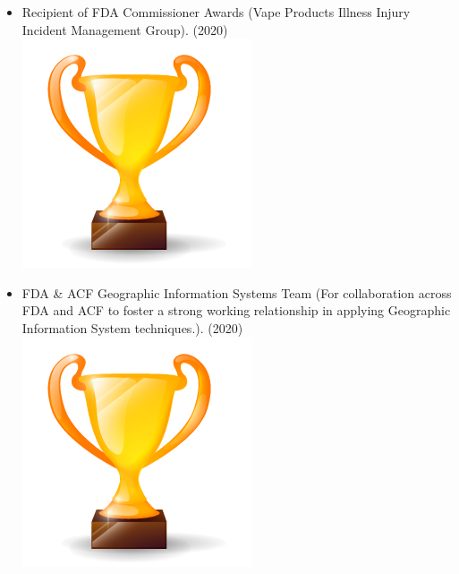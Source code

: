 \documentclass[letterpaper]{twentysecondcv} %
\begin{document}
{{\begin{itemize}
\item  Recipient of FDA Commissioner Awards (Vape Products Illness Injury Incident Management Group).  (2020)	\includegraphics[scale=0.05]{img/trophy.png}
\item	FDA & ACF Geographic Information Systems Team (For collaboration across FDA and ACF to foster a strong working relationship in applying Geographic Information System techniques.).  (2020)	\includegraphics[scale=0.05]{img/trophy.png}


\end{itemize}}}
\end{document}
